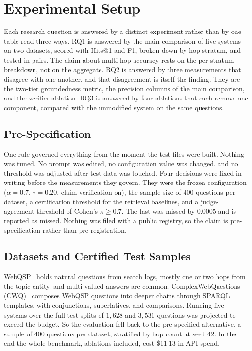 %
\section{Experimental Setup}\label{sec:setup}

Each research question is answered by a distinct experiment rather than by one
table read three ways. RQ1 is answered by the main comparison of five systems on
two datasets, scored with Hits@1 and F1, broken down by hop stratum, and tested
in pairs. The claim about multi-hop accuracy rests on the per-stratum breakdown,
not on the aggregate. RQ2 is answered by three measurements that disagree with
one another, and that disagreement is itself the finding. They are the two-tier
groundedness metric, the precision columns of the main comparison, and the
verifier ablation. RQ3 is answered by four ablations that each remove one
component, compared with the unmodified system on the same questions.

\subsection{Pre-Specification}

One rule governed everything from the moment the test files were built. Nothing
was tuned. No prompt was edited, no configuration value was changed, and no
threshold was adjusted after test data was touched. Four decisions were fixed in
writing before the measurements they govern. They were the frozen configuration
($\alpha = 0.7$, $\tau = 0.20$, claim verification on), the sample size of $400$
questions per dataset, a certification threshold for the retrieval baselines,
and a judge-agreement threshold of Cohen's $\kappa \geq 0.7$. The last was
missed by $0.0005$ and is reported as missed. Nothing was filed with a public
registry, so the claim is pre-specification rather than pre-registration.

\subsection{Datasets and Certified Test Samples}\label{sec:testsets}

WebQSP~\cite{yih2016value} holds natural questions from search logs, mostly one
or two hops from the topic entity, and multi-valued answers are common.
ComplexWebQuestions (CWQ)~\cite{talmor2018web} composes WebQSP questions into
deeper chains through SPARQL templates, with conjunctions, superlatives, and
comparisons. Running five systems over the full test splits of $1{,}628$ and
$3{,}531$ questions was projected to exceed the budget. So the evaluation fell
back to the pre-specified alternative, a sample of $400$ questions per dataset,
stratified by hop count at seed $42$. In the end the whole benchmark, ablations
included, cost \$11.13 in API spend.

